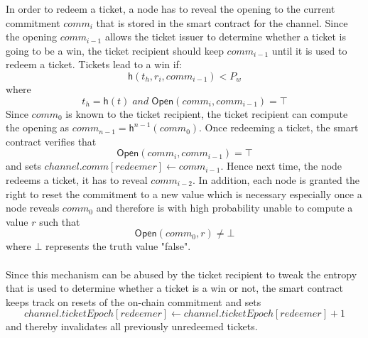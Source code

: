In order to redeem a ticket, a node has to reveal the opening to the current commitment $comm_i$ that is stored in the smart contract for the channel. Since the opening $comm_{i-1}$ allows the ticket issuer to determine whether a ticket is going to be a win, the ticket recipient should keep $comm_{i-1}$ until it is used to redeem a ticket.
Tickets lead to a win if: $$\mathsf{h}( t_h, r_i, comm_{i-1} ) < P_w$$ where $$t_h=\mathsf{h}(t) \;and\; \mathsf{Open}(comm_i, comm_{i-1}) = \top$$ Since $comm_{0}$ is known to the ticket recipient, the ticket recipient can compute the opening as $comm_{n-1} = \mathsf{h}^{n-1}(comm_0)$.
Once redeeming a ticket, the smart contract verifies that $$\mathsf{Open}(comm_i, comm_{i-1}) = \top$$ and sets $channel.comm[redeemer] \leftarrow comm_{i-1}$. Hence next time, the node redeems a ticket, it has to reveal $comm_{i-2}$.
In addition, each node is granted the right to reset the commitment to a new value which is necessary especially once a node reveals $comm_0$ and therefore is with high probability unable to compute a value $r$ such that $$\mathsf{Open}(comm_0,r) \neq \bot$$ where $\bot$ represents the truth value "false".
\\~\\Since this mechanism can be abused by the ticket recipient to tweak the entropy that is used to determine whether a ticket is a win or not, the smart contract keeps track on resets of the on-chain commitment and sets $$channel.ticketEpoch[redeemer] \leftarrow channel.ticketEpoch[redeemer] +1$$  and thereby invalidates all previously unredeemed tickets.


